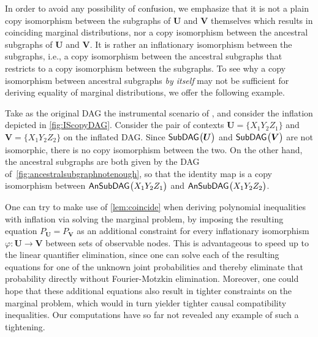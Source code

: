 {In order to avoid any possibility of confusion, we emphasize that it is not a plain copy isomorphism between the subgraphs of $\bm{U}$ and $\bm{V}$ themselves which results in coinciding marginal distributions, nor a copy isomorphism between the ancestral subgraphs of $\bm{U}$ and $\bm{V}$. It is rather an inflationary isomorphism between the subgraphs, i.e., a copy isomorphism between the ancestral subgraphs that restricts to a copy isomorphism between the subgraphs. To see why a copy isomorphism between ancestral subgraphs {\em by itself} may not be sufficient for deriving equality of marginal distributions, we offer the following example.

Take as the original DAG the instrumental scenario of \citet{pearl1995instrumental}, and consider the inflation depicted in \cref{fig:IScopyDAG}.  Consider the pair of contexts $\bm{U} = \{ X_1 Y_2 Z_1\}$ and $\bm{V}= \{ X_1 Y_2 Z_2\}$ on the inflated DAG. Since ${\operatorname{\mathsf{SubDAG}}_{}}\bigl\lparen\bm{U}\bigr\rparen$ and ${\operatorname{\mathsf{SubDAG}}_{}}\bigl\lparen\bm{V}\bigr\rparen$ are not isomorphic, there is no copy isomorphism between the two. On the other hand, 
the ancestral subgraphs are both given by the DAG of~\cref{fig:ancestralsubgraphnotenough}, so that the identity map is a copy isomorphism between ${\operatorname{\mathsf{AnSubDAG}}_{}}\bigl\lparen X_1 Y_2 Z_1\bigr\rparen$ and ${\operatorname{\mathsf{AnSubDAG}}_{}}\bigl\lparen X_1 Y_2 Z_2\bigr\rparen$.



One can try to make use of \cref{lem:coincide} when deriving polynomial inequalities with inflation via solving the marginal problem, by imposing the resulting equation $P_{\bm{U}} = P_{\bm{V}}$ as an additional constraint for every inflationary isomorphism $\varphi : \bm{U}\to\bm{V}$ between sets of observable nodes. This is advantageous to speed up to the linear quantifier elimination, since one can solve each of the resulting equations for one of the unknown joint probabilities and thereby eliminate that probability directly without Fourier-Motzkin elimination. Moreover, one could hope that these additional equations also result in tighter constraints on the marginal problem, which would in turn yielder tighter causal compatibility inequalities. Our computations have so far not revealed any example of such a tightening.

}
